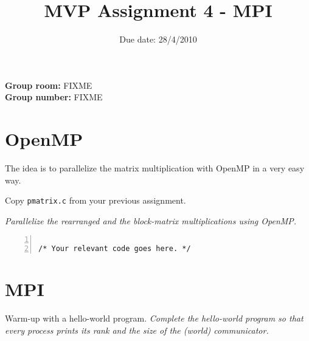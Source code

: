 \documentclass{article}
\title{MVP Assignment 4 - MPI}
\date{Due date: 28/4/2010}
\begin{document}
\maketitle


\newcommand{\question}[1]{}
\newcommand{\answer}[1]{{#1}}

%
%
\answer{
\begin{flushleft}
{\bf Group room:} FIXME\\
{\bf Group number:} FIXME
\end{flushleft}
}

\section{OpenMP}

The idea is to parallelize the matrix
multiplication with OpenMP in a very easy way.

\begin{ExerciseList}
\Exercise Copy \texttt{pmatrix.c} from your previous assignment.

\Question \emph{Parallelize the rearranged and the block-matrix
  multiplications using OpenMP.}

\end{ExerciseList}

\begin{lstlisting}[basicstyle=\small\sffamily,
keywords={break,case,const,continue,default,else,enum,
for,if,return,switch,while,do,long,void,int,float,double,
char,struct,typedef,include,size\_t},
keywordstyle={\color{blue}},
comment={[l]{//}}, morecomment={[s]{/*}{*/}}, commentstyle=\itshape,
columns={[l]flexible}, numbers=left, numberstyle=\tiny,
frameround=fftt, frame=shadowbox, captionpos=b,
caption={Your OpenMP implementation.},
label=LST:openmp]

/* Your relevant code goes here. */
\end{lstlisting}

\section{MPI}

\begin{ExerciseList}
\Exercise Warm-up with a hello-world program.
\Question \emph{Complete the hello-world program so that every process
  prints its rank and the size of the (world) communicator.}
\end{ExerciseList}
\end{document}
